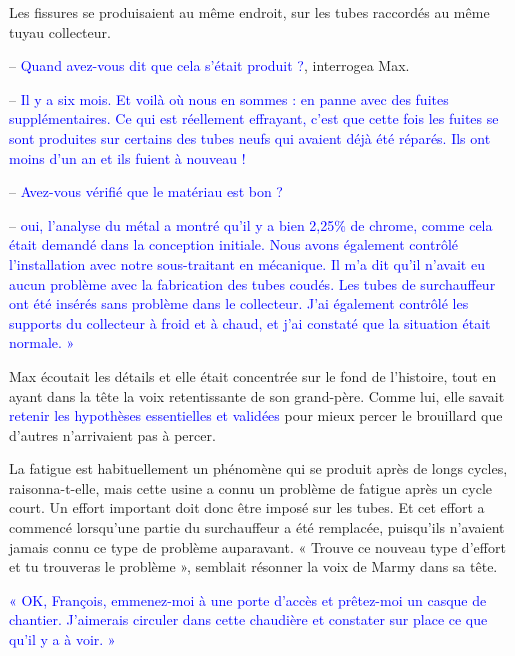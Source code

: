 Les fissures se produisaient au même endroit, sur les tubes raccordés au même tuyau collecteur.
\vspace{0.3cm}

– \textcolor{blue}{Quand avez-vous dit que cela s’était produit ?}, interrogea Max.
\vspace{0.3cm}

–  \textcolor{blue}{Il y a six mois. Et voilà où nous en sommes : en panne avec des fuites supplémentaires. Ce qui est réellement effrayant, c’est que cette fois les fuites se sont produites sur certains des tubes neufs qui avaient déjà été réparés. Ils ont moins d’un an et ils fuient à nouveau !}
\vspace{0.3cm}

–  \textcolor{blue}{Avez-vous vérifié que le matériau est bon ?}
\vspace{0.3cm}

–  \textcolor{blue}{oui, l’analyse du métal a montré qu’il y a bien 2,25\% de chrome, comme cela était demandé dans la conception initiale. Nous avons également contrôlé l’installation avec notre sous-traitant en mécanique. Il m’a dit qu’il n’avait eu aucun problème avec la fabrication des tubes coudés. Les tubes de surchauffeur ont été insérés sans problème dans le collecteur. J’ai également contrôlé les supports du collecteur à froid et à chaud, et j’ai constaté que la situation était normale. »}
\vspace{0.3cm}

Max écoutait les détails et elle était concentrée sur le fond de l’histoire, tout en ayant dans la tête la voix retentissante de son grand-père. Comme lui, elle savait \textcolor{blue}{retenir les hypothèses essentielles et validées} pour mieux percer le brouillard que d’autres n’arrivaient pas à percer. 
\vspace{0.3cm}

La fatigue est habituellement un phénomène qui se produit après de longs cycles, raisonna-t-elle, mais cette usine a connu un problème de fatigue après un cycle court. Un effort important doit donc être imposé sur les tubes. Et cet effort a commencé lorsqu’une partie du surchauffeur a été remplacée, puisqu’ils n’avaient jamais connu ce type de problème auparavant. « Trouve ce nouveau type d’effort et tu trouveras le problème », semblait résonner la voix de Marmy dans sa tête. 
\vspace{0.3cm}

\textcolor{blue}{« OK, François, emmenez-moi à une porte d’accès et prêtez-moi un casque de chantier. J’aimerais circuler dans cette chaudière et constater sur place ce que qu’il y a à voir. »}
\vspace{0.3cm}

